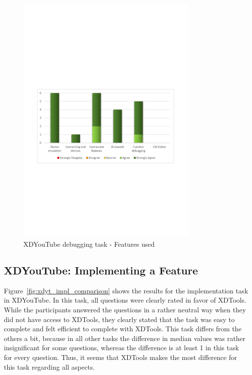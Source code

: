\begin{figure}[H]
  \centering
    \includegraphics[width=0.8\textwidth]{images/charts/xdyt_bug_features_used.pdf}
	\caption[xdyt-bug: Features used]{XDYouTube debugging task - Features used}
	\label{fig:xdyt_bug_features_used}
\end{figure}

\subsection{XDYouTube: Implementing a Feature}

Figure~\ref{fig:xdyt_impl_comparison} shows the results for the implementation task in XDYouTube. In this task, all questions were clearly rated in favor of XDTools. While the participants answered the questions in a rather neutral way when they did not have access to XDTools, they clearly stated that the task was easy to complete and felt efficient to complete with XDTools. This task differs from the others a bit, because in all other tasks the difference in median values was rather insignificant for some questions, whereas the difference is at least 1 in this task for every question. Thus, it seems that XDTools makes the most difference for this task regarding all aspects.

